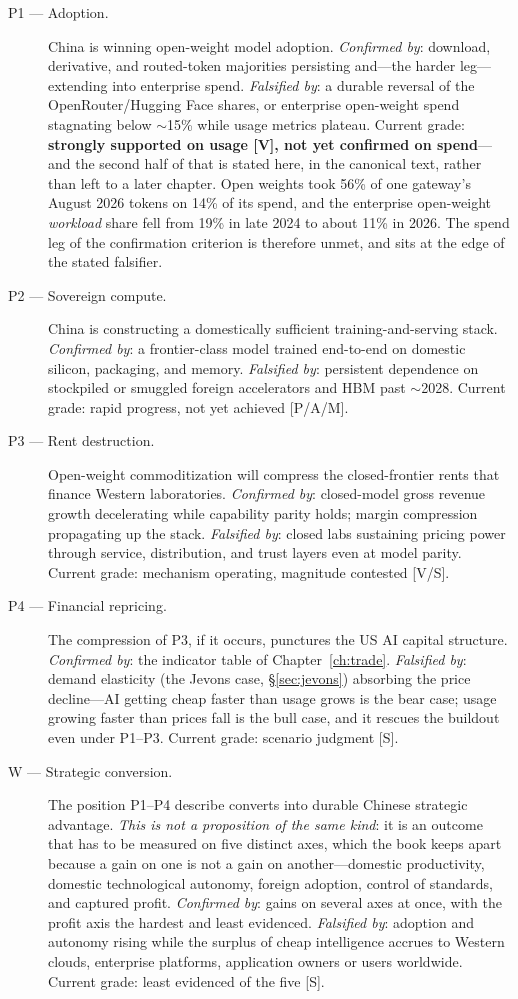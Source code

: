\begin{description}
  \item[P1 --- Adoption.] China is winning open-weight model adoption. \emph{Confirmed by}: download, derivative, and routed-token majorities persisting and---the harder leg---extending into enterprise spend. \emph{Falsified by}: a durable reversal of the OpenRouter/Hugging Face shares, or enterprise open-weight spend stagnating below $\sim$15\% while usage metrics plateau. Current grade: \textbf{strongly supported on usage [V], not yet confirmed on spend}---and the second half of that is stated here, in the canonical text, rather than left to a later chapter. Open weights took 56\% of one gateway's August 2026 tokens on 14\% of its spend, and the enterprise open-weight \emph{workload} share fell from 19\% in late 2024 to about 11\% in 2026. The spend leg of the confirmation criterion is therefore unmet, and sits at the edge of the stated falsifier.
  \item[P2 --- Sovereign compute.] China is constructing a domestically sufficient training-and-serving stack. \emph{Confirmed by}: a frontier-class model trained end-to-end on domestic silicon, packaging, and memory. \emph{Falsified by}: persistent dependence on stockpiled or smuggled foreign accelerators and HBM past $\sim$2028. Current grade: rapid progress, not yet achieved [P/A/M].
  \item[P3 --- Rent destruction.] Open-weight commoditization will compress the closed-frontier rents that finance Western laboratories. \emph{Confirmed by}: closed-model gross revenue growth decelerating while capability parity holds; margin compression propagating up the stack. \emph{Falsified by}: closed labs sustaining pricing power through service, distribution, and trust layers even at model parity. Current grade: mechanism operating, magnitude contested [V/S].
  \item[P4 --- Financial repricing.] The compression of P3, if it occurs, punctures the US AI capital structure. \emph{Confirmed by}: the indicator table of Chapter~\ref{ch:trade}. \emph{Falsified by}: demand elasticity (the Jevons case, \S\ref{sec:jevons}) absorbing the price decline---AI getting cheap faster than usage grows is the bear case; usage growing faster than prices fall is the bull case, and it rescues the buildout even under P1--P3. Current grade: scenario judgment [S].
  \item[W --- Strategic conversion.] The position P1--P4 describe converts into durable Chinese strategic advantage. \emph{This is not a proposition of the same kind}: it is an outcome that has to be measured on five distinct axes, which the book keeps apart because a gain on one is not a gain on another---domestic productivity, domestic technological autonomy, foreign adoption, control of standards, and captured profit. \emph{Confirmed by}: gains on several axes at once, with the profit axis the hardest and least evidenced. \emph{Falsified by}: adoption and autonomy rising while the surplus of cheap intelligence accrues to Western clouds, enterprise platforms, application owners or users worldwide. Current grade: least evidenced of the five [S].
\end{description}

